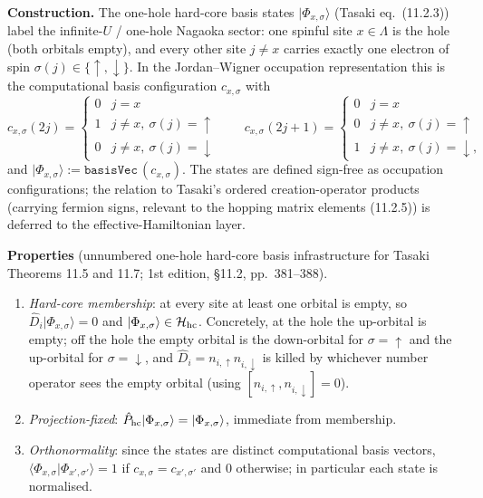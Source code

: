 \documentclass[a4paper,11pt]{article}
\begin{document}
\noindent\textbf{Construction.}
The one-hole hard-core basis states \(|\Phi_{x,\sigma}\rangle\) (Tasaki
eq.~(11.2.3)) label the infinite-\(U\) / one-hole Nagaoka sector: one
spinful site \(x\in\Lambda\) is the hole (both orbitals empty), and every
other site \(j\neq x\) carries exactly one electron of spin
\(\sigma(j)\in\{\uparrow,\downarrow\}\). In the Jordan--Wigner occupation
representation this is the computational basis configuration
\(c_{x,\sigma}\) with
\[
  c_{x,\sigma}(2j)=\begin{cases}0 & j=x\\ 1 & j\neq x,\ \sigma(j)=\uparrow\\
    0 & j\neq x,\ \sigma(j)=\downarrow\end{cases}
  \qquad
  c_{x,\sigma}(2j{+}1)=\begin{cases}0 & j=x\\ 0 & j\neq x,\ \sigma(j)=\uparrow\\
    1 & j\neq x,\ \sigma(j)=\downarrow,\end{cases}
\]
and \(|\Phi_{x,\sigma}\rangle := \mathtt{basisVec}\,(c_{x,\sigma})\). The
states are defined sign-free as occupation configurations; the relation to
Tasaki's ordered creation-operator products (carrying fermion signs,
relevant to the hopping matrix elements (11.2.5)) is deferred to the
effective-Hamiltonian layer.

\medskip
\noindent\textbf{Properties} (unnumbered one-hole hard-core basis
infrastructure for Tasaki Theorems 11.5 and 11.7; 1st edition, §11.2,
pp.~381--388).
\begin{enumerate}
  \item \emph{Hard-core membership}: at every site at least one orbital is
    empty, so \(\hat D_i|\Phi_{x,\sigma}\rangle = 0\) and
    \(|\Phi_{x,\sigma}\rangle\in\mathcal H_{\rm hc}\). Concretely, at the
    hole the up-orbital is empty; off the hole the empty orbital is the
    down-orbital for \(\sigma=\uparrow\) and the up-orbital for
    \(\sigma=\downarrow\), and \(\hat D_i = n_{i,\uparrow}n_{i,\downarrow}\)
    is killed by whichever number operator sees the empty orbital (using
    \([n_{i,\uparrow},n_{i,\downarrow}]=0\)).
  \item \emph{Projection-fixed}: \(\hat P_{\rm hc}|\Phi_{x,\sigma}\rangle =
    |\Phi_{x,\sigma}\rangle\), immediate from membership.
  \item \emph{Orthonormality}: since the states are distinct computational
    basis vectors, \(\langle\Phi_{x,\sigma}|\Phi_{x',\sigma'}\rangle = 1\) if
    \(c_{x,\sigma}=c_{x',\sigma'}\) and \(0\) otherwise; in particular each
    state is normalised.
\end{enumerate}
\end{document}

